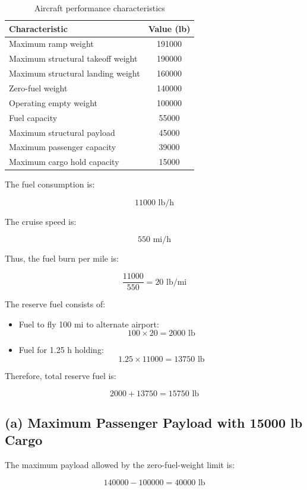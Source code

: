 \documentclass{KPS_assignment}
\begin{document}
\begin{table}[h!]
\centering
\begin{tabular}{lc}
\hline
Characteristic & Value (lb) \\
\hline
Maximum ramp weight & 191000 \\
Maximum structural takeoff weight & 190000 \\
Maximum structural landing weight & 160000 \\
Zero-fuel weight & 140000 \\
Operating empty weight & 100000 \\
Fuel capacity & 55000 \\
Maximum structural payload & 45000 \\
Maximum passenger capacity & 39000 \\
Maximum cargo hold capacity & 15000 \\
\hline
\end{tabular}
\caption{Aircraft performance characteristics}
\end{table}

The fuel consumption is:

\[
11000 \text{ lb/h}
\]

The cruise speed is:

\[
550 \text{ mi/h}
\]

Thus, the fuel burn per mile is:

\[
\frac{11000}{550}=20 \text{ lb/mi}
\]

The reserve fuel consists of:

\begin{itemize}
    \item Fuel to fly 100 mi to alternate airport:
\[
100 \times 20 = 2000 \text{ lb}
\]

    \item Fuel for 1.25 h holding:
\[
1.25 \times 11000 = 13750 \text{ lb}
\]
\end{itemize}

Therefore, total reserve fuel is:

\[
2000 + 13750 = 15750 \text{ lb}
\]

\subsection*{(a) Maximum Passenger Payload with 15000 lb Cargo}

The maximum payload allowed by the zero-fuel-weight limit is:

\[
140000 - 100000 = 40000 \text{ lb}
\]
\end{document}
